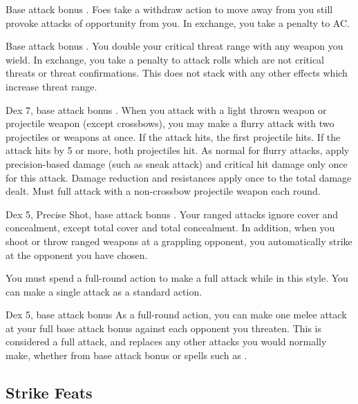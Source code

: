 \featpre Base attack bonus .
\featben Foes take a withdraw action to move away from you still provoke attacks of opportunity from you. In exchange, you take a  penalty to AC.

 Base attack bonus .
 You double your critical threat range with any weapon you wield. In exchange, you take a  penalty to attack rolls which are not critical threats or threat confirmations. This does not stack with any other effects which increase threat range.

 Dex 7, base attack bonus .
 When you attack with a light thrown weapon or projectile weapon (except crossbows), you may make a flurry attack with two projectiles or weapons at once. If the attack hits, the first projectile hits. If the attack hits by 5 or more, both projectiles hit. As normal for flurry attacks, apply precision-based damage (such as sneak attack) and critical hit damage only once for this attack. Damage reduction and resistances apply once to the total damage dealt.
 Must full attack with a non-crossbow projectile weapon each round.

 Dex 5, Precise Shot, base attack bonus .
 Your ranged attacks ignore cover and concealment, except total cover and total concealment. In addition, when you shoot or throw ranged weapons at a grappling opponent, you automatically strike at the opponent you have chosen.

You must spend a full-round action to make a full attack while in this style. You can make a single attack as a standard action.

 Dex 5, base attack bonus 
 As a full-round action, you can make one melee attack at your full base attack bonus against each opponent you threaten. This is considered a full attack, and replaces any other attacks you would normally make, whether from base attack bonus or spells such as .

\subsection{Strike Feats}\label{Strike Feats}

